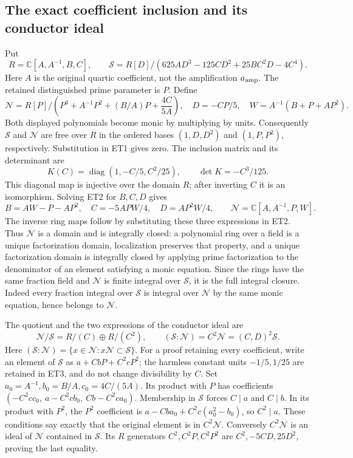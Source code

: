 \documentclass[11pt]{article}
\newcommand{\diag}{\operatorname{diag}}
\begin{document}
\subsection{The exact coefficient inclusion and its conductor ideal}
Put
\[
 R=\mathbb C[A,A^{-1},B,C],\qquad
 \mathscr S=R[D]/(625AD^3-125CD^2+25BC^2D-4C^4).
 \tag{ET1}
\]
Here $A$ is the original quartic coefficient, not the amplification
$a_{\rm amp}$. The retained distinguished prime parameter is $P$.
Define
\[
 \mathscr N=R[P]/\left(P^3+A^{-1}P^2+(B/A)P+\frac{4C}{5A}\right),
 \quad D=-CP/5,\quad W=A^{-1}(B+P+AP^2).
 \tag{ET2}
\]
Both displayed polynomials become monic by multiplying by units.
Consequently $\mathscr S$ and $\mathscr N$ are free over $R$ in the
ordered bases $(1,D,D^2)$ and $(1,P,P^2)$, respectively. Substitution
in ET1 gives zero. The inclusion matrix and its determinant are
\[
 K(C)=\diag(1,-C/5,C^2/25),\qquad \det K=-C^3/125.
 \tag{ET3}
\]
This diagonal map is injective over the domain $R$; after inverting
$C$ it is an isomorphism. Solving ET2 for $B,C,D$ gives
\[
 B=AW-P-AP^2,\quad C=-5APW/4,\quad D=AP^2W/4,
 \qquad \mathscr N=\mathbb C[A,A^{-1},P,W].
 \tag{ET4}
\]
The inverse ring maps follow by substituting these three expressions
in ET2. Thus $\mathscr N$ is a domain and is integrally closed:
a polynomial ring over a field is a unique factorization domain,
localization preserves that property, and a unique factorization
domain is integrally closed by applying prime factorization to the
denominator of an element satisfying a monic equation.
Since the rings have the same fraction field and $\mathscr N$ is
finite integral over $\mathscr S$, it is the full integral closure.
Indeed every fraction integral over $\mathscr S$ is integral over
$\mathscr N$ by the same monic equation, hence belongs to $\mathscr N$.

The quotient and the two expressions of the conductor ideal are
\[
 \mathscr N/\mathscr S=R/(C)\oplus R/(C^2),\qquad
 (\mathscr S:\mathscr N)=C^2\mathscr N=(C,D)^2\mathscr S .
 \tag{ET5}
\]
Here $(\mathscr S:\mathscr N)=\{x\in\mathscr N:x\mathscr N\subset\mathscr S\}$.
For a proof retaining every coefficient, write an element of $\mathscr S$
as $a+CbP+C^2cP^2$; the harmless constant units $-1/5,1/25$
are retained in ET3, and do not change divisibility by $C$.
Set $a_0=A^{-1},b_0=B/A,c_0=4C/(5A)$.
Its product with $P$ has coefficients
$(-C^2cc_0,\ a-C^2cb_0,\ Cb-C^2ca_0)$.
Membership in $\mathscr S$ forces $C\mid a$ and $C\mid b$.
In its product with $P^2$, the $P^2$ coefficient is
$a-Cba_0+C^2c(a_0^2-b_0)$, so $C^2\mid a$.
These conditions say exactly that the original element is in $C^2\mathscr N$.
Conversely $C^2\mathscr N$ is an ideal of $\mathscr N$ contained in
$\mathscr S$. Its $R$ generators $C^2,C^2P,C^2P^2$ are
$C^2,-5CD,25D^2$, proving the last equality.
\end{document}

